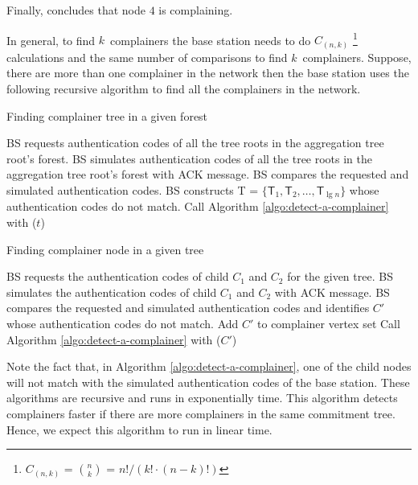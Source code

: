 		Finally, concludes that node $4 $ is complaining.
		
		In general, to find $k$\ complainers the base station needs to do $C_{(n,k)}$ \footnote{$C_{(n,k)}$ = $ n \choose k$ = $n!/(k! \cdot (n-k)!)$} calculations and the same number of comparisons to find $k$\ complainers.
		Suppose, there are more than one complainer in the network then the base station uses the following recursive algorithm to find all the complainers in the network.
		
		\begin{algorithm}[h!]
			\caption{Finding complainer tree in a given forest}
			\label{algo:detect-a-complainer-tree}
			\begin{algorithmic}[1]
				\STATE BS requests authentication codes of all the tree roots in the aggregation tree root's forest.
				\STATE BS simulates authentication codes of all the tree roots in the aggregation tree root's forest with ACK message.
				\STATE BS compares the requested and simulated authentication codes.
				\STATE BS constructs \textsf{T} = $\{\textsf{T}_{1},\textsf{T}_{2},\dotsc,\textsf{T}_{\lg n}\}$ whose authentication codes do not match.
					\STATE Call Algorithm \ref{algo:detect-a-complainer} with ($t$)			
				\ENDFOR 
			\end{algorithmic}
		\end{algorithm}

		\begin{algorithm}[h!]
			\caption{Finding complainer node in a given tree}
			\label{algo:detect-a-complainer}
			\begin{algorithmic}[1]
				\STATE BS requests the authentication codes of child $C_{1}$ and $C_{2}$ for the given tree.
				\STATE BS simulates the authentication codes of child $C_{1}$ and $C_{2}$ with ACK message.
				\STATE BS compares the requested and simulated authentication codes and identifies $C'$ whose authentication codes do not match.
					\STATE Add $C'$ to complainer vertex set  
				\ELSE
					\STATE Call Algorithm \ref{algo:detect-a-complainer} with ($C'$)			
				\ENDIF
			\end{algorithmic}
		\end{algorithm}
		Note the fact that, in Algorithm \ref{algo:detect-a-complainer}, one of the child nodes will not match with the simulated authentication codes of the base station.
		These algorithms are recursive and runs in exponentially time.
		This algorithm detects complainers faster if there are more complainers in the same commitment tree.
		Hence, we expect this algorithm to run in linear time.

